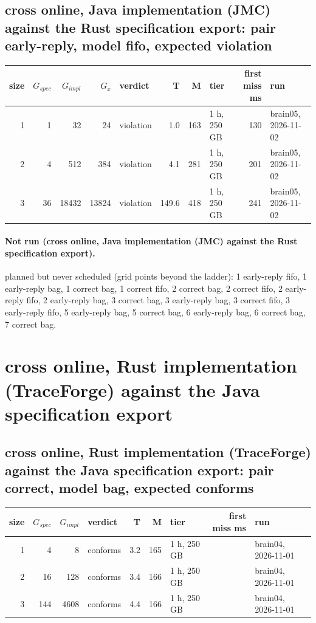 \documentclass[10pt]{article}
\begin{document}
\subsection*{cross online, Java implementation (JMC) against the Rust specification export: pair \textsf{early-reply}, model fifo, expected violation}
\begin{longtable}{@{}rrrrlrrlrl@{}}
\toprule
size & $G_{\mathit{spec}}$ & $G_{\mathit{impl}}$ & $G_x$ & verdict & T & M & tier & first miss ms & run \\
\midrule
\endhead
\color{red} 1 & 1 & 32 & 24 & violation & 1.0 & 163 & 1 h, 250 GB & 130 & brain05, 2026-11-02 \\
\color{red} 2 & 4 & 512 & 384 & violation & 4.1 & 281 & 1 h, 250 GB & 201 & brain05, 2026-11-02 \\
\color{red} 3 & 36 & 18432 & 13824 & violation & 149.6 & 418 & 1 h, 250 GB & 241 & brain05, 2026-11-02 \\
\bottomrule
\end{longtable}
\paragraph{Not run (cross online, Java implementation (JMC) against the Rust specification export).}
planned but never scheduled (grid points beyond the ladder): 1 early-reply fifo, 1 early-reply bag, 1 correct bag, 1 correct fifo, 2 correct bag, 2 correct fifo, 2 early-reply fifo, 2 early-reply bag, 3 correct bag, 3 early-reply bag, 3 correct fifo, 3 early-reply fifo, 5 early-reply bag, 5 correct bag, 6 early-reply bag, 6 correct bag, 7 correct bag.\par
\section*{cross online, Rust implementation (TraceForge) against the Java specification export}
\subsection*{cross online, Rust implementation (TraceForge) against the Java specification export: pair \textsf{correct}, model bag, expected conforms}
\begin{longtable}{@{}rrrlrrlrl@{}}
\toprule
size & $G_{\mathit{spec}}$ & $G_{\mathit{impl}}$ & verdict & T & M & tier & first miss ms & run \\
\midrule
\endhead
\color{red} 1 & 4 & 8 & conforms & 3.2 & 165 & 1 h, 250 GB &  & brain04, 2026-11-01 \\
\color{red} 2 & 16 & 128 & conforms & 3.4 & 166 & 1 h, 250 GB &  & brain04, 2026-11-01 \\
\color{red} 3 & 144 & 4608 & conforms & 4.4 & 166 & 1 h, 250 GB &  & brain04, 2026-11-01 \\
\bottomrule
\end{longtable}
\end{document}
